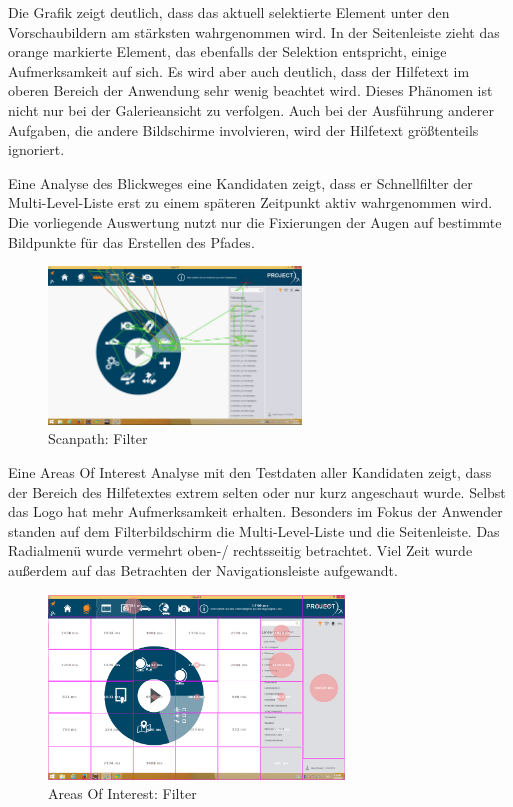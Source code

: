 Die Grafik zeigt deutlich, dass das aktuell selektierte Element unter den Vorschaubildern am stärksten wahrgenommen wird. In der Seitenleiste zieht das orange markierte Element, das ebenfalls der Selektion entspricht, einige Aufmerksamkeit auf sich. Es wird aber auch deutlich, dass der Hilfetext im oberen Bereich der Anwendung sehr wenig beachtet wird. Dieses Phänomen ist nicht nur bei der Galerieansicht zu verfolgen. Auch bei der Ausführung anderer Aufgaben, die andere Bildschirme involvieren, wird der Hilfetext größtenteils ignoriert.\par
Eine Analyse des Blickweges eine Kandidaten zeigt, dass er Schnellfilter der Multi-Level-Liste erst zu einem späteren Zeitpunkt aktiv wahrgenommen wird. Die vorliegende Auswertung nutzt nur die Fixierungen der Augen auf bestimmte Bildpunkte für das Erstellen des Pfades.\par
\begin{figure}[H]
 \centering
 \includegraphics[width=0.6\textwidth]{grafiken/scanpath.png}
 \caption{Scanpath: Filter}
 \label{fig:scanFilter}
\end{figure}
Eine Areas Of Interest Analyse mit den Testdaten aller Kandidaten zeigt, dass der Bereich des Hilfetextes extrem selten oder nur kurz angeschaut wurde. Selbst das Logo hat mehr Aufmerksamkeit erhalten. Besonders im Fokus der Anwender standen auf dem Filterbildschirm die Multi-Level-Liste und die Seitenleiste. Das Radialmenü wurde vermehrt oben-/ rechtsseitig betrachtet. Viel Zeit wurde außerdem auf das Betrachten der Navigationsleiste aufgewandt.
\begin{figure}[H]
 \centering
 \includegraphics[width=0.7\textwidth]{grafiken/areas_of_interest_filter.png}
 \caption{Areas Of Interest: Filter}
 \label{fig:aoiFIlter}
\end{figure}

